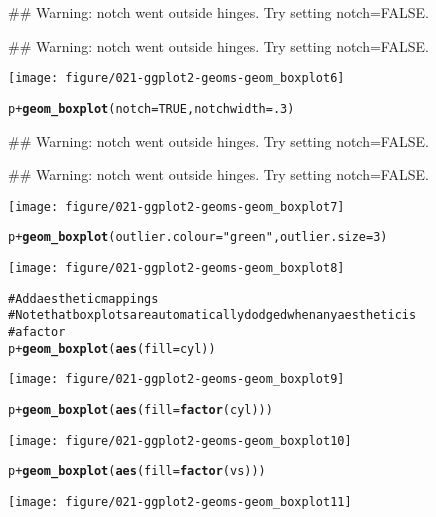 \documentclass[a4paper,titlepage]{tufte-handout}\usepackage{graphicx, color}
\makeatletter
\def\maxwidth{ %
  \ifdim\Gin@nat@width>\linewidth
    \linewidth
  \else
    \Gin@nat@width
  \fi
}
\newcommand{\hlfunctioncall}[1]{\textcolor[rgb]{0.501960784313725,0,0.329411764705882}{\textbf{#1}}}%
\newcommand{\hlstring}[1]{\textcolor[rgb]{0.6,0.6,1}{#1}}%
\newcommand{\hlcomment}[1]{\textcolor[rgb]{0.180392156862745,0.6,0.341176470588235}{#1}}%
\newenvironment{kframe}{%
 \def\at@end@of@kframe{}%
 \ifinner\ifhmode%
  \def\at@end@of@kframe{\end{minipage}}%
  \begin{minipage}{\columnwidth}%
 \fi\fi%
 \def\FrameCommand##1{\hskip\@totalleftmargin \hskip-\fboxsep
 \colorbox{shadecolor}{##1}\hskip-\fboxsep
     \hskip-\linewidth \hskip-\@totalleftmargin \hskip\columnwidth}%
 \MakeFramed {\advance\hsize-\width
   \@totalleftmargin\z@ \linewidth\hsize
   \@setminipage}}%
 {\par\unskip\endMakeFramed%
 \at@end@of@kframe}
\newenvironment{knitrout}{}{} %
\makeatother
\begin{document}
\begin{knitrout}
\begin{kframe}
{\ttfamily\noindent\textcolor{warningcolor}{\#\# Warning: notch went outside hinges. Try setting notch=FALSE.}}

{\ttfamily\noindent\textcolor{warningcolor}{\#\# Warning: notch went outside hinges. Try setting notch=FALSE.}}\end{kframe}\texttt{[image: figure/021-ggplot2-geoms-geom\_boxplot6]} \begin{kframe}\begin{alltt}
p + \hlfunctioncall{geom_boxplot}(notch = TRUE, notchwidth = .3)
\end{alltt}


{\ttfamily\noindent\textcolor{warningcolor}{\#\# Warning: notch went outside hinges. Try setting notch=FALSE.}}

{\ttfamily\noindent\textcolor{warningcolor}{\#\# Warning: notch went outside hinges. Try setting notch=FALSE.}}\end{kframe}\texttt{[image: figure/021-ggplot2-geoms-geom\_boxplot7]} \begin{kframe}\begin{alltt}
p + \hlfunctioncall{geom_boxplot}(outlier.colour = \hlstring{"green"}, outlier.size = 3)
\end{alltt}
\end{kframe}\texttt{[image: figure/021-ggplot2-geoms-geom\_boxplot8]} \begin{kframe}\begin{alltt}
\hlcomment{# Add aesthetic mappings}
\hlcomment{# Note that boxplots are automatically dodged when any aesthetic is}
\hlcomment{# a factor}
p + \hlfunctioncall{geom_boxplot}(\hlfunctioncall{aes}(fill = cyl))
\end{alltt}
\end{kframe}\texttt{[image: figure/021-ggplot2-geoms-geom\_boxplot9]} \begin{kframe}\begin{alltt}
p + \hlfunctioncall{geom_boxplot}(\hlfunctioncall{aes}(fill = \hlfunctioncall{factor}(cyl)))
\end{alltt}
\end{kframe}\texttt{[image: figure/021-ggplot2-geoms-geom\_boxplot10]} \begin{kframe}\begin{alltt}
p + \hlfunctioncall{geom_boxplot}(\hlfunctioncall{aes}(fill = \hlfunctioncall{factor}(vs)))
\end{alltt}
\end{kframe}\texttt{[image: figure/021-ggplot2-geoms-geom\_boxplot11]} \begin{kframe}\begin{alltt}

\end{alltt}
\end{kframe}
\end{knitrout}
\end{document}
